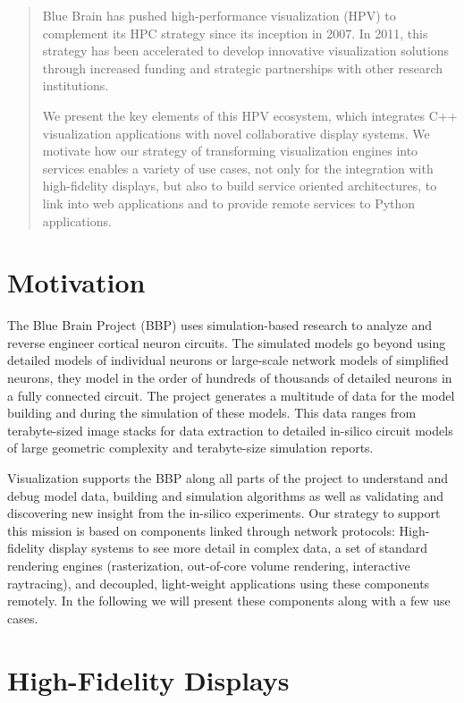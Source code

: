 \documentclass[10pt]{llncs}
\begin{document}
\begin{abstract}
  Blue Brain has pushed high-performance visualization (HPV) to complement its
  HPC strategy since its inception in 2007. In 2011, this strategy has been
  accelerated to develop innovative visualization solutions through increased
  funding and strategic partnerships with other research institutions.

  We present the key elements of this HPV ecosystem, which integrates C++
  visualization applications with novel collaborative display systems. We
  motivate how our strategy of transforming visualization engines into services
  enables a variety of use cases, not only for the integration with
  high-fidelity displays, but also to build service oriented architectures, to
  link into web applications and to provide remote services to Python
  applications.
\end{abstract}

\section{Motivation}

The Blue Brain Project (BBP) uses simulation-based research to analyze and
reverse engineer cortical neuron circuits. The simulated models go beyond using
detailed models of individual neurons or large-scale network models of
simplified neurons, they model in the order of hundreds of thousands of detailed
neurons in a fully connected circuit. The project generates a multitude of data
for the model building and during the simulation of these models. This data
ranges from terabyte-sized image stacks for data extraction to detailed
in-silico circuit models of large geometric complexity and terabyte-size
simulation reports.

Visualization supports the BBP along all parts of the project to understand and
debug model data, building and simulation algorithms as well as validating and
discovering new insight from the in-silico experiments. Our strategy to support
this mission is based on components linked through network protocols:
High-fidelity display systems to see more detail in complex data, a set of
standard rendering engines (rasterization, out-of-core volume rendering,
interactive raytracing), and decoupled, light-weight applications using
these components remotely. In the following we will present these components
along with a few use cases.


\section{High-Fidelity Displays}
\end{document}
